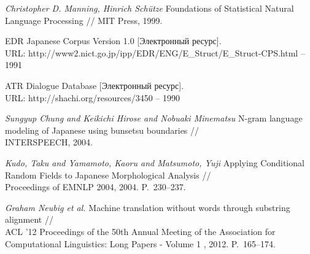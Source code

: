 \begin{thebibliography}{00}
\textit{Christopher D. Manning, Hinrich Schütze} Foundations of Statistical Natural Language Processing //
MIT Press, 1999.

 EDR Japanese Corpus Version 1.0 [Электронный ресурс]. \\ URL: http://www2.nict.go.jp/ipp/EDR/ENG/E\_Struct/E\_Struct-CPS.html -- 1991

 ATR Dialogue Database [Электронный ресурс]. \\ URL: http://shachi.org/resources/3450 -- 1990

\textit{Sungyup Chung and Keikichi Hirose and Nobuaki Minematsu} N-gram language modeling of Japanese using bunsetsu boundaries //\\
INTERSPEECH, 2004.

\textit{Kudo, Taku and Yamamoto, Kaoru and Matsumoto, Yuji} Applying Conditional Random Fields to Japanese Morphological Analysis //\\
Proceedings of EMNLP 2004, 2004. P.~230--237.

\textit{Graham Neubig et al.} Machine translation without words through substring alignment //\\
ACL '12 Proceedings of the 50th Annual Meeting of the Association for Computational Linguistics: Long Papers - Volume 1 , 2012. P.~165--174.

\end{thebibliography}